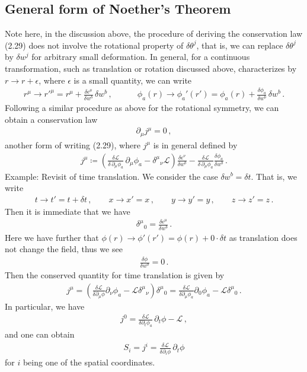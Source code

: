 \documentclass[11pt, onesided]{book}
\theoremstyle{break}
\theoremstyle{break}
\newcommand{\pd}{\partial}
\newcommand{\example}{\color{green}Example: \color{black}}
\begin{document}
\subsection{General form of Noether's Theorem}
Note here, in the discussion above, the procedure of deriving the conservation law (2.29) does not involve the rotational property of $\delta\theta^j$, that is, we can replace $\delta \theta^j$ by $\delta w^j$ for arbitrary small deformation. In general, for a continuous transformation, such as translation or rotation discussed above, characterizes by $r \to r+ \epsilon$, where $\epsilon$ is a small quantity, we can write
\begin{align*}
r^\mu \to r'^\mu = r^\mu + \frac{\delta \epsilon^\mu}{\delta w^b}\, \delta w^b\,,\qquad\quad
\phi_a(r) \to \phi_a'(r') = \phi_a(r) + \frac{\delta \phi_a}{\delta w^b}\,\delta w^b\,.
\end{align*}
Following a similar procedure as above for the rotational symmetry, we can obtain a conservation law
\begin{align*}
\pd_\mu j^\mu = 0\,,
\end{align*}
another form of writing (2.29), where $j^\mu$ is in general defined by
\begin{align*}
j^\mu \coloneqq \left( \frac{\delta \mathcal{L}}{\delta \, \pd_\mu \phi_a}\, \pd_\mu \phi_a - \delta^{\mu}{}_\nu \mathcal{L}\right) \frac{\delta \epsilon^\nu}{\delta w^b} - \frac{\delta \mathcal{L}}{\delta \,\pd_\mu \phi_a} \frac{\delta \phi_a}{\delta w^b}\,.
\end{align*}
\example Revisit of time translation. We consider the case $\delta w^b = \delta t$. That is, we write
\begin{align*}
t \to t' = t+\delta t\,,\qquad x \to x' = x \,,\qquad y \to y' = y \,,\qquad z\to z' = z\,.
\end{align*}
Then it is immediate that we have
\begin{align*}
\delta^{\mu}{}_0 = \frac{\delta \epsilon^\mu}{\delta w^b}\,.
\end{align*}
Here we have further that $\phi(r) \to \phi'(r') = \phi(r) + 0 \cdot \delta t$ as translation does not change the field, thus we see 
\begin{align*}
\frac{\delta \phi}{\delta w^b} = 0\,.
\end{align*}
Then the conserved quantity for time translation is given by
\begin{align*}
j^\mu = \left( \frac{\delta \mathcal{L}}{\delta \pd_\mu \phi}\pd_\nu \phi_a - \mathcal{L}\delta^\mu{}_\nu \right) \delta^\mu{}_0 = \frac{\delta \mathcal{L}}{\delta \pd_\mu \phi_a}\pd_0\phi_a - \mathcal{L}\delta^\mu{}_0\,.
\end{align*}
In particular, we have
\begin{align*}
j^0 = \frac{\delta \mathcal{L}}{\delta \pd_t \phi_a}\, \pd_t \phi - \mathcal{L}\,,
\end{align*}
and one can obtain
\begin{align*}
S_i = j^i = \frac{\delta \mathcal{L}}{\delta \pd_i \phi} \, \pd_t \phi
\end{align*}
for $i$ being one of the spatial coordinates. \\
\end{document}
